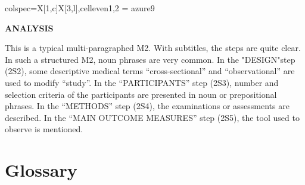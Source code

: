 \documentclass{ctexbook}
\begin{document}
\begin{sample}[label={myautocounter}]{\heiti}
{\begin{tblr}{colspec={X[1,c]X[3,l]},cell{even}{1,2} = {azure9}}
    \bottomrule
  \end{tblr}
  }


  \noindent \textbf{ANALYSIS}

  This is a typical multi-paragraphed M2. With subtitles, the steps are quite clear. In such a structured M2, noun phrases are very common. In the "DESIGN"step (2S2), some descriptive medical terms ``cross-sectional'' and ``observational'' are used to modify ``study''. In the ``PARTICIPANTS'' step (2S3), number and selection criteria of the participants are presented in noun or prepositional phrases. In the ``METHODS'' step (2S4), the examinations or assessments are described. In the ``MAIN OUTCOME MEASURES'' step (2S5), the tool used to observe is mentioned.

\end{sample}

\section{Glossary}
\end{document}
